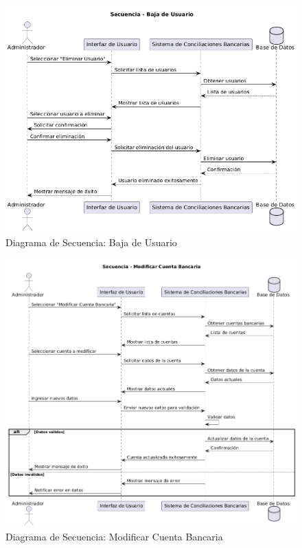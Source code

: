 \documentclass{article}
\begin{document}
\begin{figure}
    \centering
    \includegraphics[width=\textwidth]{secuencia/BajaDeUsuario.png}
    \caption{Diagrama de Secuencia: Baja de Usuario}
\end{figure}

\begin{figure}
    \centering
    \includegraphics[width=\textwidth]{secuencia/ModificarCuentaBancaria.png}
    \caption{Diagrama de Secuencia: Modificar Cuenta Bancaria}
\end{figure}
\end{document}

